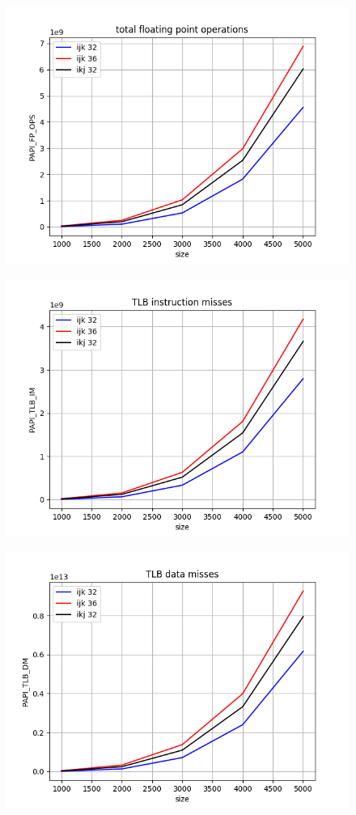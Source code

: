 \documentclass[14pt]{extarticle}
\begin{document}
\begin{figure}[H]
	\centering
	\includegraphics[scale=1]{Figure_5}
\end{figure}

\begin{figure}[H]
	\centering
	\includegraphics[scale=1]{Figure_6}
\end{figure}

\begin{figure}[H]
	\centering
	\includegraphics[scale=1]{Figure_7}
\end{figure}
\end{document}
